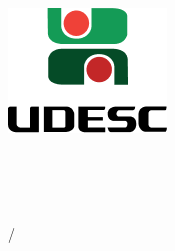 \thispagestyle{empty}
\begin{center}
	\begin{minipage}[!]{\linewidth}
		\begin{minipage}[!]{.19\linewidth}
			\includegraphics[width=\textwidth]{img/logo.png}
		\end{minipage}
		\begin{minipage}[!]{.8\linewidth}
			\center
			\textsf{
				\large{
					\instituicao \\ \vspace{0.1cm}
					\centro \\	\vspace{0.17cm}			
					\departamento \\	\vspace{0.17cm}
					\disciplina
				}	
			}		
		\end{minipage}	
	\end{minipage}
	
	\vspace{5cm}
	\autor
	
	\vspace{2cm}
	\textbf{\titulo}\subtitulo
	
	\vfill
	
	\cidade/\estado
	
	\ano
\end{center}


